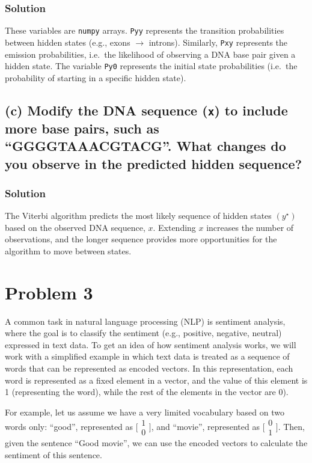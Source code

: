 \subsubsection*{Solution}

These variables are \texttt{numpy} arrays.  \texttt{Pyy} represents the transition probabilities
between hidden states (e.g., exons $\rightarrow$ introns).  Similarly, \texttt{Pxy} represents the
emission probabilities, i.e.\ the likelihood of observing a DNA base pair given a hidden state.
The variable \texttt{Py0} represents the initial state probabilities (i.e.\ the probability of starting
in a specific hidden state).

\subsection*{(c) Modify the DNA sequence (\texttt{x}) to include more base pairs, such as “GGGGTAAACGTACG”. What changes do you observe in the predicted hidden sequence?}

\subsubsection*{Solution}

The Viterbi algorithm predicts the most likely sequence of hidden states $(y^\star)$ based on the
observed DNA sequence, $x$.  Extending $x$ increases the number of observations, and the longer
sequence provides more opportunities for the algorithm to move between states.

\section*{Problem 3}

A common task in natural language processing (NLP) is sentiment analysis, where the goal is to classify the
sentiment (e.g., positive, negative, neutral) expressed in text data.  To get an idea of how sentiment analysis
works, we will work with a simplified example in which text data is treated as a sequence of words that can
be represented as encoded vectors.  In this representation, each word is represented as a fixed element in a
vector, and the value of this element is 1 (representing the word), while the rest of the elements in the vector
are 0).

For example, let us assume we have a very limited vocabulary based on two words only: “good”, represented as
\(\bigl[\begin{smallmatrix}1\\0\end{smallmatrix}\bigr]\), and “movie”, represented as
\(\bigl[\begin{smallmatrix}0\\1\end{smallmatrix}\bigr]\).  Then, given the sentence “Good movie”, we can
use the encoded vectors to calculate the sentiment of this sentence.


